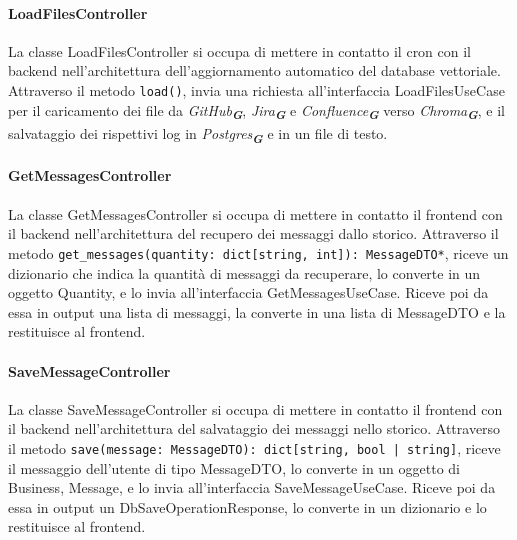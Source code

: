 \paragraph{LoadFilesController}
\label{sec:load_files_controller}
La classe LoadFilesController si occupa di mettere in contatto il cron con il backend nell'architettura dell'aggiornamento automatico del database vettoriale. Attraverso il metodo \texttt{load()}, invia una richiesta all'interfaccia LoadFilesUseCase per il caricamento dei file da \emph{GitHub}\textsubscript{\textbf{\textit{G}}}, \emph{Jira}\textsubscript{\textbf{\textit{G}}} e \emph{Confluence}\textsubscript{\textbf{\textit{G}}} verso \emph{Chroma}\textsubscript{\textbf{\textit{G}}}, e il salvataggio dei rispettivi log in \emph{Postgres}\textsubscript{\textbf{\textit{G}}} e in un file di testo.

\paragraph{GetMessagesController}
\label{sec:get_messages_controller}
La classe GetMessagesController si occupa di mettere in contatto il frontend con il backend nell'architettura del recupero dei messaggi dallo storico. Attraverso il metodo \texttt{get\_messages(quantity: dict[string, int]): MessageDTO*}, riceve un dizionario che indica la quantità di messaggi da recuperare, lo converte in un oggetto Quantity, e lo invia all'interfaccia GetMessagesUseCase. Riceve poi da essa in output una lista di messaggi, la converte in una lista di MessageDTO e la restituisce al frontend.

\paragraph{SaveMessageController}
\label{sec:save_message_controller}
La classe SaveMessageController si occupa di mettere in contatto il frontend con il backend nell'architettura del salvataggio dei messaggi nello storico. Attraverso il metodo \texttt{save(message: MessageDTO): dict[string, bool | string]}, riceve il messaggio dell'utente di tipo MessageDTO, lo converte in un oggetto di Business, Message, e lo invia all'interfaccia SaveMessageUseCase. Riceve poi da essa in output un DbSaveOperationResponse, lo converte in un dizionario e lo restituisce al frontend.

